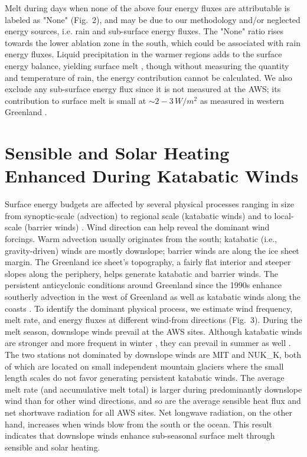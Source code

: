 \documentclass[draft]{agujournal2019}
\begin{document}
Melt during days when none of the above four energy fluxes 
are attributable is labeled as "None" (Fig.~2), 
and may be due to our methodology and/or neglected energy sources, 
i.e. rain and sub-surface energy fluxes.
The "None" ratio rises towards the lower ablation zone in the south,
which could be associated with rain energy fluxes.
Liquid precipitation in the warmer regions adds to the surface energy balance, 
yielding surface melt \cite{Fausto2016a}, 
though without measuring the quantity and temperature of rain, 
the energy contribution cannot be calculated. 
We also exclude any sub-surface energy flux 
since it is not measured at the AWS; 
its contribution to surface melt is small at $\sim 2-3 \, W/m^{2}$
as measured in western Greenland \cite{VandenBroeke2011, VanAs2011a}.


\section{Sensible and Solar Heating Enhanced During Katabatic Winds}
Surface energy budgets are affected by several physical processes 
ranging in size from synoptic-scale (advection) \cite{Hanna2013}
to regional scale (katabatic winds) \cite{VanDenBroeke1996} and 
to local-scale (barrier winds) \cite{VanDenBroeke1996}. 
Wind direction can help reveal the dominant wind forcings. 
Warm advection usually originates from the south; 
katabatic (i.e., gravity-driven) winds are mostly downslope; 
barrier winds are along the ice sheet margin. 
The Greenland ice sheet's topography,
a fairly flat interior and steeper slopes along the periphery,
helps generate katabatic and barrier winds.
The persistent anticyclonic conditions around Greenland 
since the 1990s \cite{Hanna2018} enhance southerly advection 
in the west of Greenland \cite{Hanna2013} 
as well as katabatic winds along the coasts \cite{Turton2019}.
To identify the dominant physical process, 
we estimate wind frequency, melt rate, and energy fluxes 
at different wind-from directions (Fig.~3). 
During the melt season, downslope winds prevail at the AWS sites. 
Although katabatic winds are stronger and 
more frequent in winter \cite{Gorter2014}, 
they can prevail in summer as well \cite{Vihma2011}. 
The two stations not dominated by downslope winds are MIT and NUK\_K, 
both of which are located on small independent mountain glaciers 
where the small length scales 
do not favor generating persistent katabatic winds. 
The average melt rate (and accumulative melt total) is larger 
during predominantly downslope wind than for other wind directions, 
and so are the average sensible heat flux 
and net shortwave radiation for all AWS sites. 
Net longwave radiation, on the other hand, 
increases when winds blow from the south or the ocean. 
This result indicates that downslope winds 
enhance sub-seasonal surface melt through sensible and solar heating.
\end{document}
